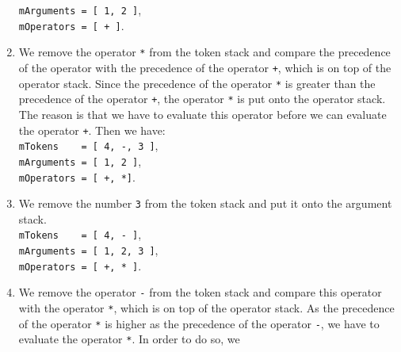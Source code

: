\begin{enumerate}
      \hspace*{1.3cm} \texttt{mArguments = [ 1, 2 ]}, \\[0.2cm]
      \hspace*{1.3cm} \texttt{mOperators = [ + ]}. 
\item We remove the operator \texttt{*} from the  token stack and compare the
      precedence of the operator with the precedence of the operator \texttt{+},
      which is on top of the operator stack.  Since the precedence of the operator 
      \texttt{*} is greater than the precedence of the operator 
      \texttt{+}, the operator \texttt{*} is put onto
      the operator stack.  The reason is that we have to evaluate this operator before we can
      evaluate the operator \texttt{+}.  Then we have: 
      \\[0.2cm]
      \hspace*{1.3cm} \texttt{mTokens \ \ \ = [ 4, -, 3 ]}, \\[0.2cm]
      \hspace*{1.3cm} \texttt{mArguments = [ 1, 2 ]}, \\[0.2cm]
      \hspace*{1.3cm} \texttt{mOperators = [ +, *]}. 
\item We remove the number \texttt{3} from the  token stack and put it onto the argument stack.
      \\[0.2cm]
      \hspace*{1.3cm} \texttt{mTokens \ \ \ = [ 4, - ]}, \\[0.2cm]
      \hspace*{1.3cm} \texttt{mArguments = [ 1, 2, 3 ]}, \\[0.2cm]
      \hspace*{1.3cm} \texttt{mOperators = [ +, * ]}. 
\item We remove the operator \texttt{-} from the token stack and
      compare this operator with the operator \texttt{*}, which is on top of
      the operator stack.  As the precedence of the  operator \texttt{*} is
      higher as the precedence of the operator \texttt{-},
      we have to evaluate the operator \texttt{*}.  In order to do so, we

\end{enumerate}
